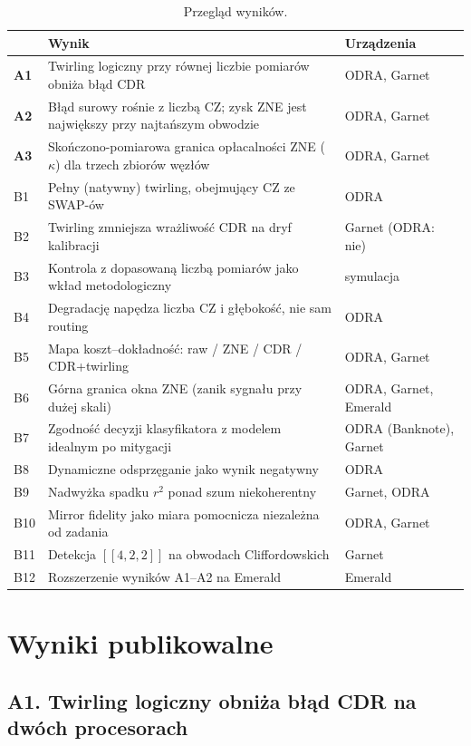 \documentclass[11pt,a4paper]{article}
\begin{document}
\begin{table}[h]\centering\small
\caption{Przegląd wyników.}
\begin{tabular}{@{}lp{9.6cm}l@{}}
\toprule
& Wynik & Urządzenia \\
\midrule
\textbf{A1} & Twirling logiczny przy równej liczbie pomiarów obniża błąd CDR & ODRA, Garnet \\
\textbf{A2} & Błąd surowy rośnie z liczbą CZ; zysk ZNE jest największy przy najtańszym obwodzie & ODRA, Garnet \\
\textbf{A3} & Skończono-pomiarowa granica opłacalności ZNE ($\kappa$) dla trzech zbiorów węzłów & ODRA, Garnet \\
\midrule
B1 & Pełny (natywny) twirling, obejmujący CZ ze SWAP-ów & ODRA \\
B2 & Twirling zmniejsza wrażliwość CDR na dryf kalibracji & Garnet (ODRA: nie) \\
B3 & Kontrola z dopasowaną liczbą pomiarów jako wkład metodologiczny & symulacja \\
B4 & Degradację napędza liczba CZ i głębokość, nie sam routing & ODRA \\
B5 & Mapa koszt--dokładność: raw / ZNE / CDR / CDR+twirling & ODRA, Garnet \\
B6 & Górna granica okna ZNE (zanik sygnału przy dużej skali) & ODRA, Garnet, Emerald \\
B7 & Zgodność decyzji klasyfikatora z modelem idealnym po mitygacji & ODRA (Banknote), Garnet \\
B8 & Dynamiczne odsprzęganie jako wynik negatywny & ODRA \\
B9 & Nadwyżka spadku $r^2$ ponad szum niekoherentny & Garnet, ODRA \\
B10 & Mirror fidelity jako miara pomocnicza niezależna od zadania & ODRA, Garnet \\
B11 & Detekcja $[[4,2,2]]$ na obwodach Cliffordowskich & Garnet \\
B12 & Rozszerzenie wyników A1--A2 na Emerald & Emerald \\
\bottomrule
\end{tabular}
\end{table}

\section{Wyniki publikowalne}

\subsection*{A1. Twirling logiczny obniża błąd CDR na dwóch procesorach}
\end{document}
